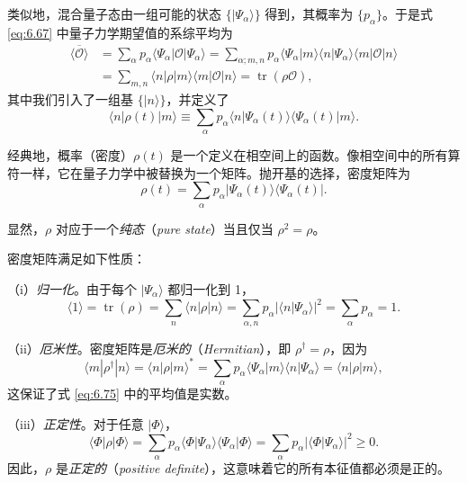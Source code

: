 类似地，混合量子态由一组可能的状态 $\{|\Psi_\alpha\rangle\}$ 得到，其概率为 $\{p_\alpha\}$。于是式 \eqref{eq:6.67} 中量子力学期望值的系综平均为
\begin{equation}\label{eq:6.75}
\begin{aligned}
\overline{\langle\mathcal O\rangle}&=\sum_\alpha p_\alpha\langle\Psi_\alpha|\mathcal O|\Psi_\alpha\rangle=\sum_{\alpha;m,n}p_\alpha\langle\Psi_\alpha|m\rangle\langle n|\Psi_\alpha\rangle\langle m|\mathcal O|n\rangle\\
&=\sum_{m,n}\langle n|\rho|m\rangle\langle m|\mathcal O|n\rangle=\operatorname{tr}(\rho\mathcal O),
\end{aligned}
\end{equation}
其中我们引入了一组基 $\{|n\rangle\}$，并定义了
\begin{equation}\label{eq:6.76}
\langle n|\rho(t)|m\rangle\equiv\sum_\alpha p_\alpha\langle n|\Psi_\alpha(t)\rangle\langle\Psi_\alpha(t)|m\rangle.
\end{equation}

经典地，概率（密度）$\rho(t)$ 是一个定义在相空间上的函数。像相空间中的所有算符一样，它在量子力学中被替换为一个矩阵。抛开基的选择，密度矩阵为
\begin{equation}\label{eq:6.77}
\rho(t)=\sum_\alpha p_\alpha|\Psi_\alpha(t)\rangle\langle\Psi_\alpha(t)|.
\end{equation}

显然，$\rho$ 对应于一个\emph{纯态}（\textit{pure state}）当且仅当 $\rho^2=\rho$。

密度矩阵满足如下性质：

（i）\emph{归一化}。由于每个 $|\Psi_\alpha\rangle$ 都归一化到 1，
\begin{equation}\label{eq:6.78}
\langle1\rangle=\operatorname{tr}(\rho)=\sum_n\langle n|\rho|n\rangle=\sum_{\alpha,n}p_\alpha|\langle n|\Psi_\alpha\rangle|^2=\sum_\alpha p_\alpha=1.
\end{equation}

（ii）\emph{厄米性}。密度矩阵是\emph{厄米的}（\textit{Hermitian}），即 $\rho^\dagger=\rho$，因为
\begin{equation}\label{eq:6.79}
\langle m|\rho^\dagger|n\rangle=\langle n|\rho|m\rangle^*=\sum_\alpha p_\alpha\langle\Psi_\alpha|m\rangle\langle n|\Psi_\alpha\rangle=\langle n|\rho|m\rangle,
\end{equation}
这保证了式 \eqref{eq:6.75} 中的平均值是实数。


（iii）\emph{正定性}。对于任意 $|\Phi\rangle$，
\begin{equation}\label{eq:6.80}
\langle\Phi|\rho|\Phi\rangle=\sum_\alpha p_\alpha\langle\Phi|\Psi_\alpha\rangle\langle\Psi_\alpha|\Phi\rangle=\sum_\alpha p_\alpha|\langle\Phi|\Psi_\alpha\rangle|^2\ge0.
\end{equation}
因此，$\rho$ 是\emph{正定的}（\textit{positive definite}），这意味着它的所有本征值都必须是正的。

